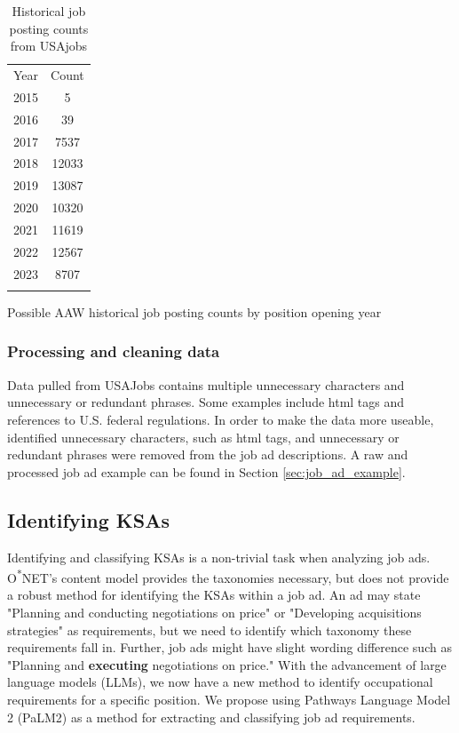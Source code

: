 \documentclass[12pt]{article}
\begin{document}
\begin{table}[ht!]
\begin{subtable}[b]{0.4\linewidth}
\begin{tabular}{cc}
            \Xhline{3\arrayrulewidth}
                Year &  Count\\\Xhline{3\arrayrulewidth}
                2015 &      5\\
                2016 &     39\\
                2017 &   7537\\
                2018 &  12033\\
                2019 &  13087\\
                2020 &  10320\\
                2021 &  11619\\
                2022 &  12567\\
                2023 &   8707\\
            \Xhline{3\arrayrulewidth}
        \end{tabular}
        \caption{Possible AAW historical job posting counts by position opening year}\label{tab:aaw_job_opening_count}
    \end{subtable}
    \caption{Historical job posting counts from USAjobs}\label{tab:usa_jobs}
\end{table}

\subsubsection{Processing and cleaning data}

Data pulled from USAJobs contains multiple unnecessary characters and unnecessary or redundant phrases. Some examples include html tags and references to U.S. federal regulations. In order to make the data more useable, identified unnecessary characters, such as html tags, and unnecessary or redundant phrases were removed from the job ad descriptions. A raw and processed job ad example can be found in Section \ref{sec:job_ad_example}.

\subsection{Identifying KSAs}

Identifying and classifying KSAs is a non-trivial task when analyzing job ads. O\textsuperscript{*}NET's content model provides the taxonomies necessary, but does not provide a robust method for identifying the KSAs within a job ad. An ad may state "Planning and conducting negotiations on price" or "Developing acquisitions strategies" as requirements, but we need to identify which taxonomy these requirements fall in. Further, job ads might have slight wording difference such as "Planning and \textbf{executing} negotiations on price." With the advancement of large language models (LLMs), we now have a new method to identify occupational requirements for a specific position. We propose using Pathways Language Model 2 (PaLM2) as a method for extracting and classifying job ad requirements.
\end{document}
